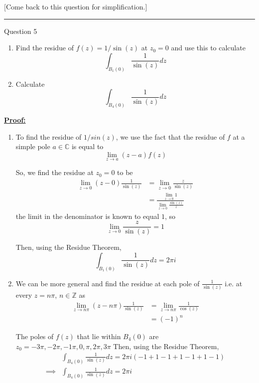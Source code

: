 \documentclass{article}
\newcommand{\C}{\mathbb{C}}
\begin{document}
[Come back to this question for simplification.]

\vskip 0.5cm
\hrule 
\vskip 0.5cm



\begin{mathdefinitionbox}{Question 5}
\vskip 0.5cm
\begin{enumerate}[label=(\alph*)]
  \item Find the residue of $f(z) = 1 / \sin(z)$ at $z_0 = 0$ and use this to calculate 
  \[  \int_{B_1(0)} \frac{1}{\sin(z)} dz \]

  \item Calculate 
  \[  \int_{B_4(0)} \frac{1}{\sin(z)} dz   \]
\end{enumerate}
\end{mathdefinitionbox}

\vskip 0.5cm
\underline{\textbf{Proof:}}

\begin{enumerate}[label=(\alph*)]
  \item To find the residue of $1/sin(z)$, we use the fact that the residue of $f$ at a simple pole $a \in \C$ is equal to
  \[ \lim_{z \rightarrow a} (z-a) f(z) \]

  So, we find the residue at $z_0 = 0$ to be 
  \begin{align*}
    \lim_{z \rightarrow 0} \left(z - 0\right) \frac{1}{\sin(z)} &= \lim_{z\rightarrow 0} \frac{z}{\sin(z)} \\
    &= \frac{\lim_{z \rightarrow 0} 1}{\lim_{z \rightarrow 0} \frac{\sin(z)}{z}}
  \end{align*}
  the limit in the denominator is known to equal $1$, so 
  \[ \lim_{z \rightarrow 0} \frac{z}{\sin(z)} = 1 \]

  Then, using the Residue Theorem, 
  \[ \boxed{\int_{B_1(0)} \frac{1}{\sin(z)} dz = 2\pi i} \]


  \item We can be more general and find the residue at each pole of $\frac{1}{\sin(z)}$ i.e. at every $z = n\pi$, $n \in \mathbb{Z}$ as 
  \begin{align*}
    \lim_{z \rightarrow n\pi} \left(z - n\pi\right) \frac{1}{\sin(z)} &= \lim_{z \rightarrow n\pi} \frac{1}{\cos(z)} \\
    &= (-1)^n
  \end{align*}

  The poles of $f(z)$ that lie within $B_4(0)$ are $z_0 = -3\pi, -2\pi, -1\pi, 0, \pi, 2\pi, 3\pi$ Then, using the Residue Theorem, 
  \begin{align*}
    &\int_{B_4(0)} \frac{1}{\sin(z)} dz = 2\pi i \left(-1 + 1 -1 + 1 -1 + 1 -1\right) \\
    \implies& \boxed{\int_{B_4(0)} \frac{1}{\sin(z)} dz = 2\pi i}
  \end{align*}
\end{enumerate}
\end{document}
